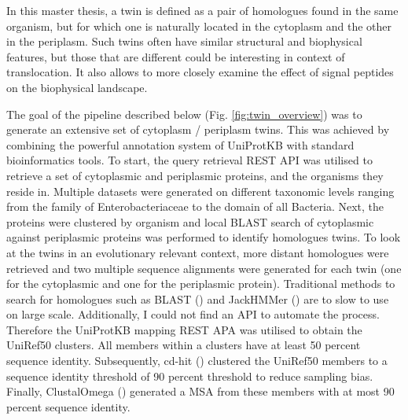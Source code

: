 In this master thesis, 
a twin is defined as a pair of homologues found in the same organism,
but for which one is naturally located in the cytoplasm and the other in the periplasm.
Such twins often have similar structural and biophysical features,
but those that are different could be interesting in context of translocation.
It also allows to more closely examine the effect of signal peptides on the  biophysical landscape.

The goal of the pipeline described below (Fig. \ref{fig:twin_overview}) was to generate an extensive set of cytoplasm / periplasm twins.
This was achieved by combining the powerful annotation system of UniProtKB with standard bioinformatics tools.
To start, the query retrieval REST API was utilised to retrieve a set of cytoplasmic and periplasmic proteins, and the organisms they reside in. 
Multiple datasets were generated on different taxonomic levels ranging from the family of Enterobacteriaceae to the domain of all Bacteria.
Next, the proteins were clustered by organism and local BLAST search of cytoplasmic against periplasmic proteins was performed to identify homologues twins.
To look at the twins in an evolutionary relevant context,
more distant homologues were retrieved and two multiple sequence alignments were generated for each twin
(one for the cytoplasmic and one for the periplasmic protein).
Traditional methods to search for homologues such as BLAST (\cite{johnson2008})
and 
JackHMMer (\cite{johnson2010})
are to slow to use on large scale.
Additionally, I could not find an API to automate the process.
Therefore the UniProtKB mapping REST APA was utilised to obtain the UniRef50 clusters.
All members within a clusters have at least 50 percent sequence identity.
Subsequently, 
cd-hit (\cite{li2006}) clustered the UniRef50 members to a sequence identity threshold of 90 percent threshold to reduce sampling bias.
Finally, ClustalOmega (\cite{sievers2014}) generated a MSA from these members with at most 90 percent sequence identity.

